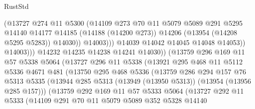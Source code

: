 \begin{lexlean}{RustStd}
\begin{coremodule}
                                (@13727
                                  @274
                                  @11
                                  @5300
                                  (@14109
                                    @273
                                    @70
                                    @11
                                    @5079
                                    @5089
                                    @291
                                    @5295
                                    @14140
                                    @14177
                                    @14185
                                    (@14188 (@14200 @273))
                                    @14206
                                    (@13954 (@14208 @5295 @5283))
                                    @14030))
                                @14003)))
                          @14039
                          @14042
                          @14045
                          @14048
                          @14053))
                      @14003)))
                @14232
                @14235
                @14238
                @14241
                @14030))
            (@13759
              @296
              @169
              @11
              @57
              @5338
              @5064
              (@13727
                @296
                @11
                @5338
                (@13921
                  @295
                  @468
                  @11
                  @5112
                  @5336
                  @4671
                  @481
                  (@13750
                    @295
                    @468
                    @5336
                    (@13759
                      @286
                      @294
                      @157
                      @76
                      @5313
                      @5335
                      (@13944 @285 @5313 (@13949 (@13950 @5313)) (@13954 (@13956 @285 @157)))
                      (@13759
                        @292
                        @169
                        @11
                        @57
                        @5333
                        @5064
                        (@13727
                          @292
                          @11
                          @5333
                          (@14109
                            @291
                            @70
                            @11
                            @5079
                            @5089
                            @352
                            @5328
                            @14140

\end{coremodule}
\end{lexlean}
